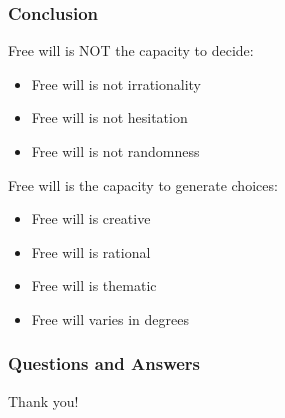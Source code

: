 \documentclass[xcolor=dvipsnames]{beamer}
\theoremstyle{definition}
\begin{document}
\begin{frame}[fragile]
  \frametitle{Conclusion}

  Free will is NOT the \alert{capacity to decide}:
  \begin{itemize}
  \item Free will is not irrationality
  \item Free will is not hesitation
  \item Free will is not randomness
  \end{itemize}

  \vspace{0.6cm}

  Free will is the \alert{capacity to generate choices}:
  \begin{itemize}
  \item Free will is creative
  \item Free will is rational
  \item Free will is thematic
  \item Free will varies in degrees
  \end{itemize}
\end{frame}

\begin{frame}[fragile]
  \frametitle{Questions and Answers}

  \begin{center}
    \Huge{Thank you!}
  \end{center}

\end{frame}
\end{document}
